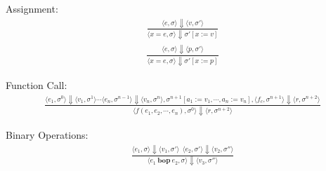\documentclass[12pt]{article}
\begin{document}
	Assignment:
	\begin{align*}
		\frac{\langle e, \sigma \rangle\Downarrow \langle v, \sigma' \rangle}
		{\langle x = e, \sigma \rangle\Downarrow \sigma' [x := v]}
	\end{align*}
	\begin{align*}
		\frac{\langle e, \sigma \rangle\Downarrow \langle p, \sigma' \rangle}
		{\langle x = e, \sigma \rangle\Downarrow \sigma' [x := p]}
	\end{align*}

	Function Call:
	{\small
  	\setlength{\abovedisplayskip}{6pt}
  	\setlength{\belowdisplayskip}{\abovedisplayskip}
  	\setlength{\abovedisplayshortskip}{0pt}
  	\setlength{\belowdisplayshortskip}{3pt}
	\begin{align*}
		\frac{
			\langle e_1, \sigma^0 \rangle\Downarrow \langle v_1, \sigma^1 \rangle
			\cdots
			\langle e_n, \sigma^{n-1} \rangle\Downarrow \langle v_n, \sigma^n \rangle,
			\sigma^{n + 1}[a_1 := v_1, \cdots, a_n := v_n],
			\langle f_c, \sigma^{n+1}\rangle\Downarrow\langle r, \sigma^{n + 2}\rangle
		}
		{\langle f(e_1, e_2, \cdots, e_n), \sigma^0 \rangle\Downarrow\langle r, \sigma^{n + 2}\rangle}
	\end{align*}
	}%
	


	Binary Operations:
	\begin{align*}
		\frac{\langle e_1, \sigma \rangle\Downarrow \langle v_1, \sigma' \rangle \ \
		\langle e_2, \sigma' \rangle\Downarrow \langle v_2, \sigma'' \rangle}
		{\langle e_1\ \textbf{bop}\ e_2, \sigma \rangle\Downarrow \langle v_3, \sigma'' \rangle}
	\end{align*}
	
\end{document}
